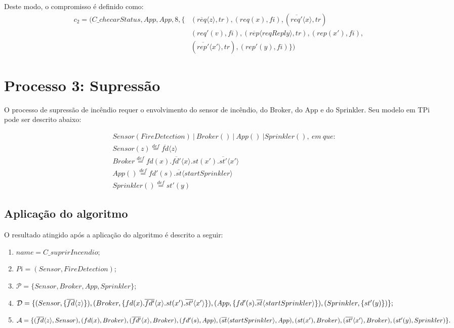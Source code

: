 Deste modo, o compromisso é definido como:
\begin{eqnarray}
c_{2} = (C\_checarStatus, App, App, 8,\{& (\overline{req}\langle z \rangle, tr), (req(x), fi), (\overline{req'}\langle x \rangle, tr)& \nonumber \\ 
&(req'(v), fi), (\overline{rep}\langle reqReply \rangle, tr), (rep(x'), fi), & \nonumber \\ 
&(\overline{rep'}\langle x' \rangle, tr), (rep'(y), fi) \} )&
\end{eqnarray}

\section{Processo 3: Supressão}

O processo de supressão de incêndio requer o envolvimento do sensor de incêndio, do Broker, do App e do Sprinkler. Seu modelo em TPi pode ser descrito abaixo:

\begin{align}
&Sensor(FireDetection)~|~Broker()~|~App()~|Sprinkler(),~em~que: \nonumber \\
&Sensor(z) \stackrel{def}{=} \overline{fd}\langle z \rangle \nonumber \\
&Broker \stackrel{def}{=} fd(x) . \overline{fd'}\langle x \rangle .  st(x') . \overline{st'}\langle x' \rangle \nonumber \\
&App() \stackrel{def}{=} fd'(s) . \overline{st}\langle startSprinkler \rangle  \nonumber \\
&Sprinkler() \stackrel{def}{=} st'(y)
\end{align}

\subsection*{Aplicação do algoritmo}

O resultado atingido após a aplicação do algoritmo é descrito a seguir:
\begin{enumerate}
	\item $name = C\_suprirIncendio$;
	\item $Pi = (Sensor, FireDetection)$;
	\item $\mathcal{P} = \{Sensor, Broker, App, Sprinkler\}$;
	\item $\mathcal{D} = \{ (Sensor, \{ \overline{fd}\langle z \rangle \nonumber \}), 
	(Broker, \{  fd(x) . \overline{fd'}\langle x \rangle .  st(x') . \overline{st'}\langle x' \rangle  \}), 
	\\
	(App, \{ fd'(s) . \overline{st}\langle startSprinkler \rangle \}), 
	(Sprinkler, \{ st'(y) \}) \};$
	\item $\mathcal{A} = \{ (\overline{fd}\langle z \rangle, Sensor), (fd(x), Broker), (\overline{fd'}\langle x \rangle, Broker), (fd'(s), App), 
	\\
	(\overline{st}\langle startSprinkler \rangle, App), (st(x'), Broker), (\overline{st'}\langle x' \rangle, Broker), (st'(y), Sprinkler) \}.$
\end{enumerate}

